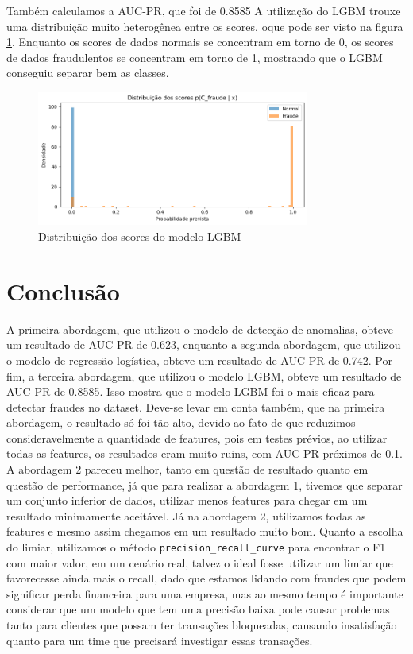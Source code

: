 \documentclass[conference]{IEEEtran}
\begin{document}
Também calculamos a AUC-PR, que foi de 0.8585
A utilização do LGBM trouxe uma distribuição muito heterogênea entre os scores, oque pode ser visto na figura \ref{fig:distribuicao_scores_lgbm}. Enquanto os scores de dados normais se concentram em torno de 0, os scores de dados fraudulentos se concentram em torno de 1, mostrando que o LGBM conseguiu separar bem as classes.
\begin{figure}[H]
    \centering
    \includegraphics[width=0.8\textwidth]{../output/distribuicao scores lgbm.png}
    \caption{Distribuição dos scores do modelo LGBM}
    \label{fig:distribuicao_scores_lgbm}
\end{figure}

\section{Conclusão}
\label{sec:conclusao}
A primeira abordagem, que utilizou o modelo de detecção de anomalias, obteve um resultado de AUC-PR de 0.623, enquanto a segunda abordagem, que utilizou o modelo de regressão logística, obteve um resultado de AUC-PR de 0.742. Por fim, a terceira abordagem, que utilizou o modelo LGBM, obteve um resultado de AUC-PR de 0.8585. Isso mostra que o modelo LGBM foi o mais eficaz para detectar fraudes no dataset. Deve-se levar em conta também, que na primeira abordagem, o resultado só foi tão alto, devido ao fato de que reduzimos consideravelmente a quantidade de features, pois em testes prévios, ao utilizar todas as features, os resultados eram muito ruins, com AUC-PR próximos de 0.1. A abordagem 2 pareceu melhor, tanto em questão de resultado quanto em questão de performance, já que para realizar a abordagem 1, tivemos que separar um conjunto inferior de dados, utilizar menos features para chegar em um resultado minimamente aceitável. Já na abordagem 2, utilizamos todas as features e mesmo assim chegamos em um resultado muito bom. Quanto a escolha do limiar, utilizamos o método \texttt{precision\_recall\_curve} para encontrar o F1 com maior valor, em um cenário real, talvez o ideal fosse utilizar um limiar que favorecesse ainda mais o recall, dado que estamos lidando com fraudes que podem significar perda financeira para uma empresa, mas ao mesmo tempo é importante considerar que um modelo que tem uma precisão baixa pode causar problemas tanto para clientes que possam ter transações bloqueadas, causando insatisfação quanto para um time que precisará investigar essas transações.
\end{document}
